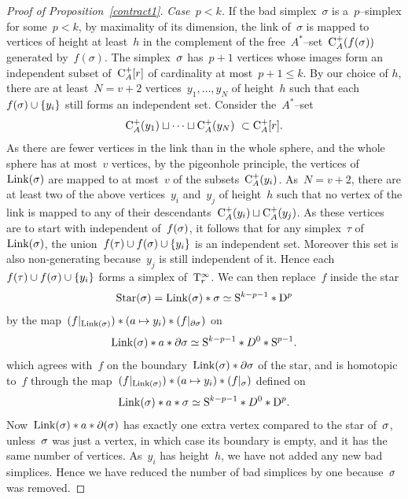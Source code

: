 \begin{proof}[Proof of Proposition~\ref{contract1}]
{\em Case~$p<k$.} If the bad simplex~$\sigma$ is a~$p$--simplex for some~$p<k$, by maximality of its dimension, the link of~$\sigma$ is mapped to vertices of height at least~$h$ in the complement of the free~$A^*$--set~$\mathrm{C}_A^+(f(\sigma))$ generated by~$f(\sigma)$. %
The simplex~$\sigma$ has~$p+1$ vertices whose images form an independent subset of~$\mathrm{C}_{A}^+[r]$ of cardinality at most~$p+1\leqslant k$.
By our choice of $h$, there are at least~$N= v+2$ vertices~$y_1,\dots,y_N$ of height~$h$ %
such that each~$f(\sigma)\cup\{y_i\}$ still forms an independent set. 
Consider the~$A^*$--set 
$$\rmC_A^+(y_1)\sqcup\dots\sqcup\rmC_A^+(y_N)\ \subset \rmC_A^+[r].$$
As there are fewer vertices in the link than in the whole sphere, and the whole sphere has at most~$v$ vertices, by the pigeonhole principle, the vertices of~$\operatorname{Link}(\sigma)$ are mapped to at most~$v$ of the subsets~$\mathrm{C}_A^+(y_i)$. As~$N=v+2$, 
there are at least two of the above vertices~$y_i$ and~$y_j$ of height~$h$  such that no vertex of the link is mapped to any of their descendants~$\mathrm{C}_A^+(y_i)\sqcup\mathrm{C}_A^+(y_j)$. As these vertices are 
to start with independent of~$f(\sigma)$, it follows that for any simplex~$\tau$ of~$\operatorname{Link}(\sigma)$, the union~$f(\tau)\cup f(\sigma)\cup\{y_i\}$ is an independent set. Moreover this set is also non-generating because~$y_j$ is still independent of it. Hence  each~$f(\tau)\cup f(\sigma)\cup\{y_i\}$ forms a simplex of~$\mathrm{T}_r^\infty$. We can then replace~$f$ inside the star
\[
\operatorname{Star}(\sigma)=\operatorname{Link}(\sigma)*\sigma\simeq \mathrm{S}^{k-p-1}*\mathrm{D}^p
\]
by the map~$(f|_{\operatorname{Link}(\sigma)})*(a\mapsto y_i)*(f|_{\partial \sigma})$ on 
\[
\operatorname{Link}(\sigma)*a*\partial\sigma\simeq \mathrm{S}^{k-p-1}*D^0*\mathrm{S}^{p-1}.
\]
which agrees with~$f$ on the boundary~$\operatorname{Link}(\sigma)*\partial\sigma$ of the star, and is homotopic to~$f$ 
through the map~$(f|_{\operatorname{Link}(\sigma)})*(a\mapsto y_i)*(f|_{\sigma})$ defined on 
\[
\operatorname{Link}(\sigma)*a*\sigma\simeq \mathrm{S}^{k-p-1}*D^0*\mathrm{D}^p.
\] 
Now~$\operatorname{Link}(\sigma)*a*\partial(\sigma)$  has exactly one extra vertex compared to the star of~$\sigma$, unless~$\sigma$ was just a vertex, in which case its boundary is empty, and it has the same number of vertices.
As~$y_i$ has height~$h$, we have not added any new bad simplices. Hence we have reduced the number of bad simplices by one because~$\sigma$ was removed. 


\end{proof}
